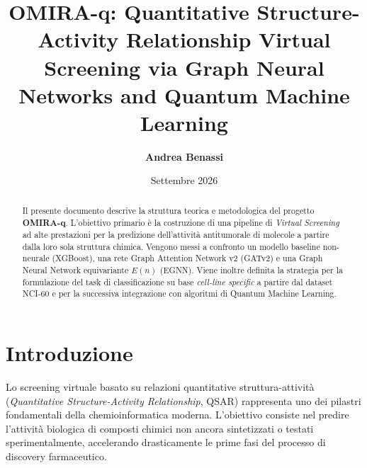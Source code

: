 \documentclass[12pt, a4paper]{article}
\title{\textbf{OMIRA-q: Quantitative Structure-Activity Relationship Virtual Screening via Graph Neural Networks and Quantum Machine Learning}}
\author{\textbf{Andrea Benassi}}
\date{Settembre 2026}
\begin{document}
\maketitle

\begin{abstract}
Il presente documento descrive la struttura teorica e metodologica del progetto \textbf{OMIRA-q}. L'obiettivo primario è la costruzione di una pipeline di \emph{Virtual Screening} ad alte prestazioni per la predizione dell'attività antitumorale di molecole a partire dalla loro sola struttura chimica. Vengono messi a confronto un modello baseline non-neurale (XGBoost), una rete Graph Attention Network v2 (GATv2) e una Graph Neural Network equivariante $E(n)$ (EGNN). Viene inoltre definita la strategia per la formulazione del task di classificazione su base \emph{cell-line specific} a partire dal dataset NCI-60 e per la successiva integrazione con algoritmi di Quantum Machine Learning.
\end{abstract}

\section{Introduzione}
Lo screening virtuale basato su relazioni quantitative struttura-attività (\emph{Quantitative Structure-Activity Relationship}, QSAR) rappresenta uno dei pilastri fondamentali della chemioinformatica moderna. L'obiettivo consiste nel predire l'attività biologica di composti chimici non ancora sintetizzati o testati sperimentalmente, accelerando drasticamente le prime fasi del processo di discovery farmaceutico.
\end{document}
